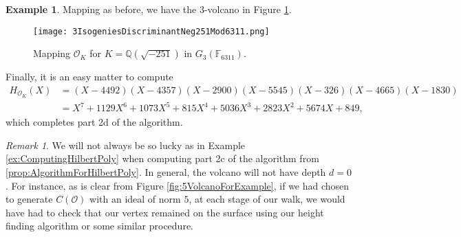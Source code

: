 \documentclass{amsart}
\theoremstyle{definition}
\newtheorem{example}[thm]{Example}
\theoremstyle{remark}
\newtheorem{remark}[thm]{Remark}
\numberwithin{equation}{section}
\newcommand{\cO}{\mathcal O}
\newcommand{\bbF}{\mathbb F}
\newcommand{\bbQ}{\mathbb Q}
\begin{document}
\begin{example}
Mapping as before, we have the $3$-volcano in Figure \ref{fig:3VolcanoForExample}.

\begin{figure} \label{fig:3VolcanoForExample}
 \centering
 \texttt{[image: 3IsogeniesDiscriminantNeg251Mod6311.png]}  %
  \caption{Mapping $\cO_{K}$ for $K = \bbQ(\sqrt{-251})$ in  $G_{3}(\bbF_{6311})$.}
 \end{figure}

Finally, it is an easy matter to compute
\begin{align*}
H_{\cO_{K}}(X)    & = (X - 4492)(X - 4357)(X - 2900)(X - 5545)(X - 326)(X - 4665)(X - 1830) \\
                  & = X^7 + 1129 X^6 + 1073 X^5 + 815 X^4 + 5036 X^3 + 2823 X^2 + 5674 X + 849,                   
\end{align*}
which completes part 2d of the algorithm.


\end{example}

\begin{remark}
We will not always be so lucky as in Example \ref{ex:ComputingHilbertPoly} when computing part 2c of the algorithm from \ref{prop:AlgorithmForHilbertPoly}. In general, the volcano will not have depth $d = 0$. For instance, as is clear from Figure \ref{fig:5VolcanoForExample}, if we had chosen to generate $C(\cO)$ with an ideal of norm $5$, at each stage of our walk, we would have had to check that our vertex remained on the surface using our height finding algorithm or some similar procedure.
\end{remark}
\end{document}
